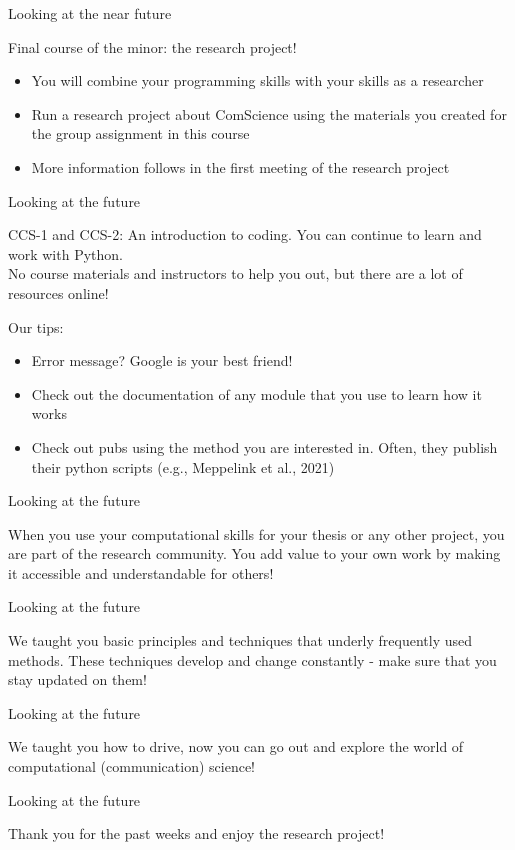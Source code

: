 \documentclass[compress]{beamer}
\begin{document}
\begin{frame}{Looking at the near future} 
	\begin{alertblock}{	Final course of the minor: the research project!}
		\begin{itemize}
			\item You will combine your programming skills with your skills as a researcher
			\item Run a research project about ComScience using the materials you created for the group assignment in this course
			\item More information follows in the first meeting of the research project
		\end{itemize}
	\end{alertblock}
\end{frame}


\begin{frame}{Looking at the future} 
	
	CCS-1 and CCS-2: An introduction to coding. You can continue to learn and work with Python.\\
	No course materials and instructors to help you out, but there are a lot of resources online!\\
	\begin{alertblock}{Our tips:}
		\begin{itemize}
			\item Error message? Google is your best friend!
			\item Check out the documentation of any module that you use to learn how it works
			\item Check out pubs using the method you are interested in. Often, they publish their python scripts (e.g., Meppelink et al., 2021)
		\end{itemize}
	\end{alertblock}	
\end{frame}


\begin{frame}{Looking at the future} 
	
	When you use your computational skills for your thesis or any other project, you are part of the research community. You add value to your own work by making it accessible and understandable for others!
	
\end{frame}


\begin{frame}{Looking at the future} 
	
	We taught you basic principles and techniques that underly frequently used methods. These techniques develop and change constantly - make sure that you stay updated on them!
	
	
\end{frame}



\begin{frame}{Looking at the future} 
	
	We taught you how to drive, now you can go out and explore the world of computational (communication) science!
	
\end{frame}


\begin{frame}{Looking at the future} 
	
	Thank you for the past weeks and enjoy the research project!
	
\end{frame}
\end{document}
